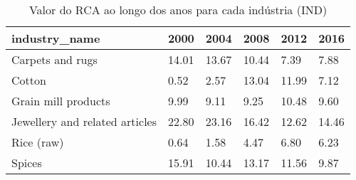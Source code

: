 \begin{table}
\centering
\caption{Valor do RCA ao longo dos anos para cada indústria (IND)}
\begin{tabular}{p{6cm}p{1.5cm}p{1.5cm}p{1.5cm}p{1.5cm}p{1.5cm}}
\toprule
                 industry\_name &  2000 &  2004 &  2008 &  2012 &  2016 \\
\midrule
              Carpets and rugs & 14.01 & 13.67 & 10.44 &  7.39 &  7.88 \\
                        Cotton &  0.52 &  2.57 & 13.04 & 11.99 &  7.12 \\
           Grain mill products &  9.99 &  9.11 &  9.25 & 10.48 &  9.60 \\
Jewellery and related articles & 22.80 & 23.16 & 16.42 & 12.62 & 14.46 \\
                    Rice (raw) &  0.64 &  1.58 &  4.47 &  6.80 &  6.23 \\
                        Spices & 15.91 & 10.44 & 13.17 & 11.56 &  9.87 \\
\bottomrule
\end{tabular}
\end{table}
